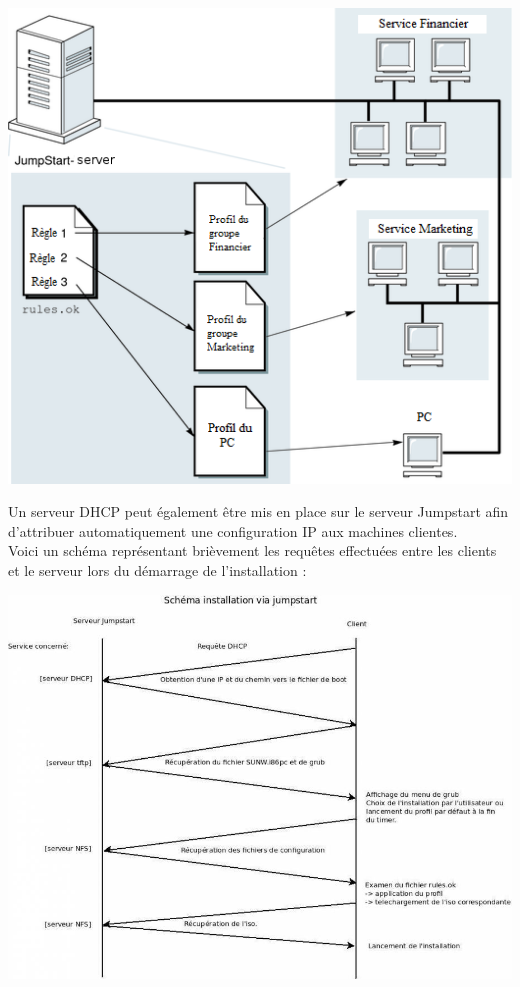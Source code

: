 \documentclass[a4paper,12pt,one side,titlepage]{report}
\begin{document}
\begin{center}\includegraphics[scale=0.7]{./img/jumpstart2.png}\end{center}

Un serveur DHCP peut également être mis en place sur le serveur Jumpstart afin d'attribuer automatiquement une configuration IP aux machines clientes.\\

Voici un schéma représentant brièvement les requêtes effectuées entre les clients et le serveur lors du démarrage de l'installation :\\
\begin{center}\includegraphics[scale=0.4]{./img/jumpstart.jpeg}\end{center}
\end{document}
